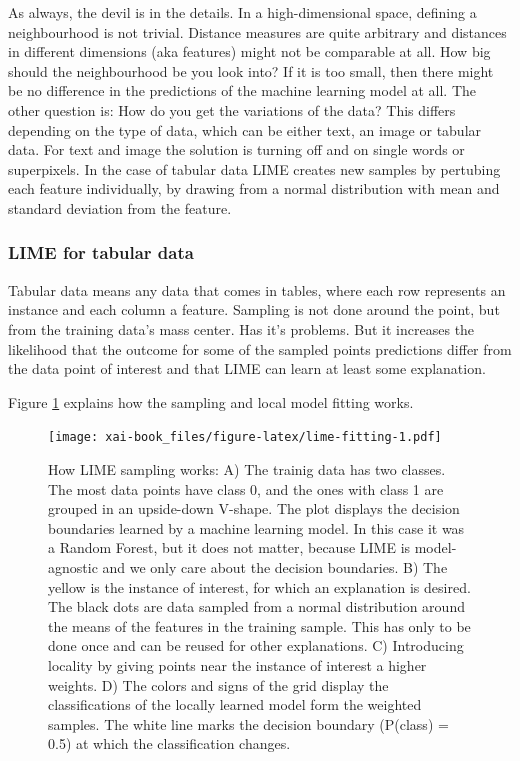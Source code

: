 \documentclass[12pt,]{krantz}
\theoremstyle{definition}
\theoremstyle{definition}
\theoremstyle{definition}
\theoremstyle{remark}
\begin{document}
As always, the devil is in the details. In a high-dimensional space,
defining a neighbourhood is not trivial. Distance measures are quite
arbitrary and distances in different dimensions (aka features) might not
be comparable at all. How big should the neighbourhood be you look into?
If it is too small, then there might be no difference in the predictions
of the machine learning model at all. The other question is: How do you
get the variations of the data? This differs depending on the type of
data, which can be either text, an image or tabular data. For text and
image the solution is turning off and on single words or superpixels. In
the case of tabular data LIME creates new samples by pertubing each
feature individually, by drawing from a normal distribution with mean
and standard deviation from the feature.

\subsubsection{LIME for tabular data}\label{lime-for-tabular-data}

Tabular data means any data that comes in tables, where each row
represents an instance and each column a feature. Sampling is not done
around the point, but from the training data's mass center. Has it's
problems. But it increases the likelihood that the outcome for some of
the sampled points predictions differ from the data point of interest
and that LIME can learn at least some explanation.

Figure \ref{fig:lime-fitting} explains how the sampling and local model
fitting works.

\begin{figure}
\centering
\texttt{[image: xai-book\_files/figure-latex/lime-fitting-1.pdf]}
\caption{\label{fig:lime-fitting}How LIME sampling works: A) The trainig
data has two classes. The most data points have class 0, and the ones
with class 1 are grouped in an upside-down V-shape. The plot displays
the decision boundaries learned by a machine learning model. In this
case it was a Random Forest, but it does not matter, because LIME is
model-agnostic and we only care about the decision boundaries. B) The
yellow is the instance of interest, for which an explanation is desired.
The black dots are data sampled from a normal distribution around the
means of the features in the training sample. This has only to be done
once and can be reused for other explanations. C) Introducing locality
by giving points near the instance of interest a higher weights. D) The
colors and signs of the grid display the classifications of the locally
learned model form the weighted samples. The white line marks the
decision boundary (P(class) = 0.5) at which the classification changes.}
\end{figure}
\end{document}
